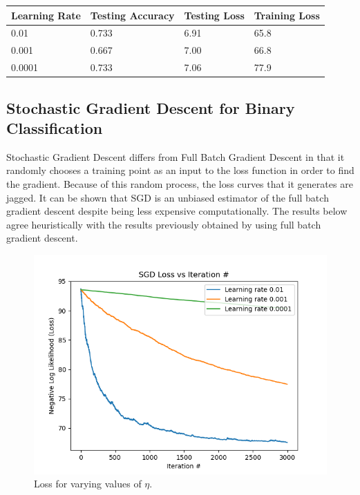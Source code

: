 \documentclass[11pt,letterpaper,titlepage]{article}
\begin{document}
	\begin{tabular}{|l|l|l|l|}
		\hline
		Learning Rate & Testing Accuracy & Testing Loss & Training Loss \\ \hline
		0.01          & 0.733            & 6.91         & 65.8          \\ \hline
		0.001         & 0.667            & 7.00         & 66.8          \\ \hline
		0.0001        & 0.733            & 7.06         & 77.9          \\ \hline
	\end{tabular}
 	\label{Full Batch GD}
 	
	
	
	\subsection{Stochastic Gradient Descent for Binary Classification}
	Stochastic Gradient Descent differs from Full Batch Gradient Descent in that it randomly chooses a training point as an input to the loss function in order to find the gradient. Because of this random process, the loss curves that it generates are jagged. It can be shown that SGD is an unbiased estimator of the full batch gradient descent despite being less expensive computationally. The results below agree heuristically with the results previously obtained by using full batch gradient descent.
	\begin{figure}[H]
		\includegraphics[width=\linewidth]{SGD.png}
		\caption{Loss for varying values of $\eta$.}
		\label{fig: Stochastic GD}
	\end{figure}
\end{document}
